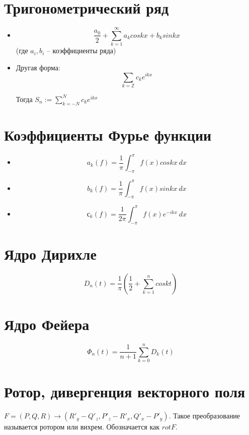 \documentclass[paper=a4, fontsize=17pt]{article}
\begin{document}
	\section{Тригонометрический ряд}

	\begin{itemize}
		\item $$ \frac{a_0}{2}  + \sum_{k = 1}^{\infty} a_k coskx + b_k sinkx $$ 
		(где $ a_i, b_i $ -- коэффициенты ряда)
		
		\item Другая форма:	$$ \sum_{k = \mathbb{Z}} c_k e^{ikx} $$
		
		Тогда $ S_n := \sum_{k = -N}^{N} c_k e^{ikx} $
	\end{itemize}

	\section{Коэффициенты Фурье функции}

	\begin{itemize}
		\item $$ a_k(f) = \frac{1}{\pi} \int_{-\pi}^{\pi} f(x) coskx ~ dx $$
		
		\item $$ b_k(f) = \frac{1}{\pi} \int_{-\pi}^{\pi} f(x) sinkx ~ dx $$
		
		\item $$ с_k(f) = \frac{1}{2\pi} \int_{-\pi}^{\pi} f(x) e^{-ikx} ~ dx $$
		
	\end{itemize}

	\section{Ядро Дирихле}

	$$ D_n(t) = \frac{1}{\pi}( \frac{1}{2} + \sum_{k = 1}^{n} coskt) $$
	
	\section{Ядро Фейера} 
	
	$$ \Phi_n(t) = \frac{1}{n+1} \sum_{k = 0}^{n} D_k(t) $$

	\section{Ротор, дивергенция векторного поля}
	$F = (P, Q, R) \rightarrow (R'_y - Q'_z, P'_z - R'_x, Q'_x - P'_y).$ Такое преобразование называется ротором или вихрем. Обозначается как $rot F$.
\\
\end{document}
